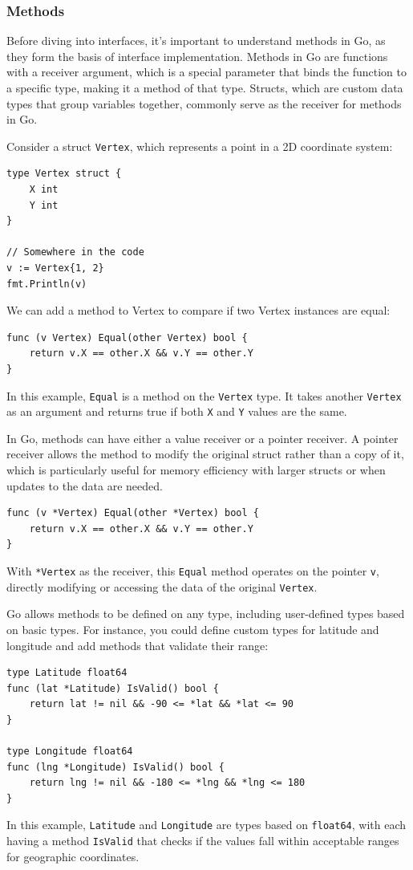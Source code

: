 \subsubsection{Methods}
Before diving into interfaces, it's important to understand methods in Go, as they form the basis of interface implementation. Methods in Go are functions with a receiver argument, which is a special parameter that binds the function to a specific type, making it a method of that type. Structs, which are custom data types that group variables together, commonly serve as the receiver for methods in Go.

Consider a struct \texttt{Vertex}, which represents a point in a 2D coordinate system:

\begin{verbatim}
type Vertex struct {
    X int
    Y int
}

// Somewhere in the code
v := Vertex{1, 2}
fmt.Println(v)
\end{verbatim}

We can add a method to Vertex to compare if two Vertex instances are equal:

\begin{verbatim}
func (v Vertex) Equal(other Vertex) bool {
    return v.X == other.X && v.Y == other.Y
}
\end{verbatim}
In this example, \texttt{Equal} is a method on the \texttt{Vertex} type. It takes another \texttt{Vertex} as an argument and returns true if both \texttt{X} and \texttt{Y} values are the same.

In Go, methods can have either a value receiver or a pointer receiver. A pointer receiver allows the method to modify the original struct rather than a copy of it, which is particularly useful for memory efficiency with larger structs or when updates to the data are needed.

\begin{verbatim}
func (v *Vertex) Equal(other *Vertex) bool {
    return v.X == other.X && v.Y == other.Y
}
\end{verbatim}
With \texttt{*Vertex} as the receiver, this \texttt{Equal} method operates on the pointer \texttt{v}, directly modifying or accessing the data of the original \texttt{Vertex}.

Go allows methods to be defined on any type, including user-defined types based on basic types. For instance, you could define custom types for latitude and longitude and add methods that validate their range:

\begin{verbatim}
type Latitude float64
func (lat *Latitude) IsValid() bool {
    return lat != nil && -90 <= *lat && *lat <= 90
}

type Longitude float64
func (lng *Longitude) IsValid() bool {
    return lng != nil && -180 <= *lng && *lng <= 180
}
\end{verbatim}
In this example, \texttt{Latitude} and \texttt{Longitude} are types based on \texttt{float64}, with each having a method \texttt{IsValid} that checks if the values fall within acceptable ranges for geographic coordinates.

